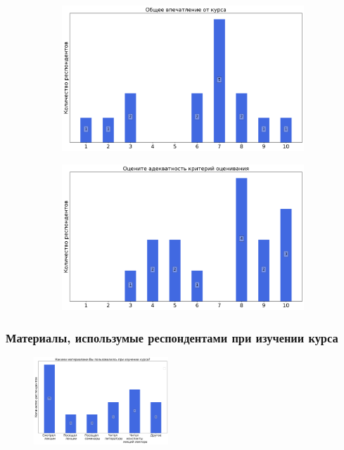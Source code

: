 		\begin{figure}[H]
			\centering
			\begin{subfigure}[b]{0.45\textwidth}
				\centering
				\includegraphics[width=\textwidth]{images/4 course/Введение в машинное обучение/general-0.png}
			\end{subfigure}
			\begin{subfigure}[b]{0.45\textwidth}
				\centering
				\includegraphics[width=\textwidth]{images/4 course/Введение в машинное обучение/general-1.png}
			\end{subfigure}	
		\end{figure}

	\subsubsection{Материалы, использумые респондентами при изучении курса}

		\begin{figure}[H]
			\centering
			\includegraphics[width = 0.45\textwidth]{images/4 course/Введение в машинное обучение/materials.png}
		\end{figure}

